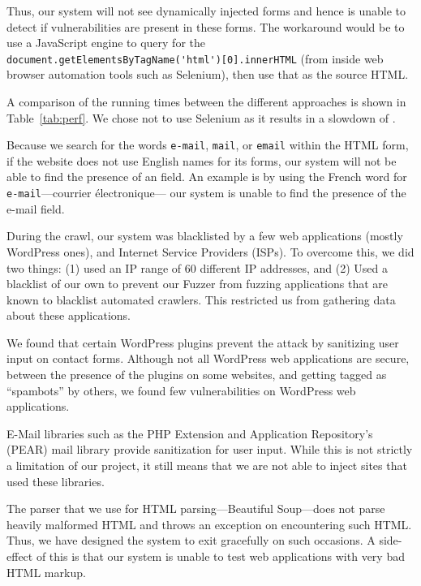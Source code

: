 		Thus, our system will not see dynamically injected forms and hence is unable to detect if \ehi vulnerabilities are present in these forms. The workaround would be to use a JavaScript engine to query for the \lstinline{document.getElementsByTagName('html')[0].innerHTML} (from inside web browser automation tools such as Selenium), then use that as the source HTML. 
		
		A comparison of the running times between the different approaches is shown in Table~\ref{tab:perf}. We chose not to use Selenium as it results in a slowdown of \slowSelenium. 


        Because we search for the words \lstinline{e-mail}, \lstinline{mail}, or \lstinline{email} within the HTML form, if the website does not use English names for its forms, our system will not be able to find the presence of an \email field. An example is by using the French word for \lstinline{e-mail}---courrier {{\'e}}lectronique--- our system is unable to find the presence of the e-mail field. 
        
		During the crawl, our system was blacklisted by a few web
        applications (mostly WordPress ones), and Internet Service
        Providers (ISPs). To overcome this, we did two things: (1)
        used an IP range of 60 different IP addresses, and (2) Used a
        blacklist of our own to prevent our Fuzzer from fuzzing
        applications that are known to blacklist automated crawlers.
        This restricted us from gathering data about these
        applications.


		We found that certain WordPress plugins prevent the \ehi attack by sanitizing user input on contact forms. Although not all  WordPress web applications are secure, between the presence of the plugins on some websites, and getting tagged as ``spambots'' by others, we found few vulnerabilities on WordPress web applications.

        E-Mail libraries such as the PHP Extension and Application Repository's (PEAR) mail library provide sanitization for user input. While this is not strictly a limitation of our project, it still means that we are not able to inject sites that used these libraries.

        The parser that we use for HTML parsing---Beautiful Soup---does not parse heavily malformed HTML and throws an exception on encountering such HTML. Thus, we have designed the system to exit gracefully on such occasions. A side-effect of this is that our system is unable to test web applications with very bad HTML markup.


